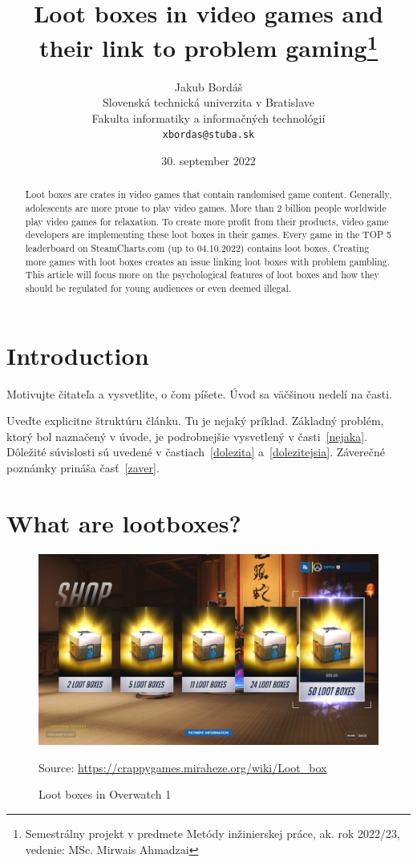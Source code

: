 \documentclass[10pt,twoside,english,a4paper]{coursepaper}
\title{Loot boxes in video games and their link to problem gaming\thanks{Semestrálny projekt v predmete Metódy inžinierskej práce, ak. rok 2022/23, vedenie: MSc. Mirwais Ahmadzai}} %
\author{Jakub Bordáš\\[2pt]
	{\small Slovenská technická univerzita v Bratislave}\\
	{\small Fakulta informatiky a informačných technológií}\\
	{\small \texttt{xbordas@stuba.sk}}
	}
\date{\small 30. september 2022} %
\newcommand{\source}[1]{\caption*{Source: {#1}} }
\begin{document}
\maketitle

\begin{abstract}
Loot boxes are crates in video games that contain randomised game content. Generally, adolescents are more prone to play video games. More than 2 billion people worldwide play video games for relaxation. To create more profit from their products, video game developers are implementing these loot boxes in their games. Every game in the TOP 5 leaderboard on SteamCharts.com (up to 04.10.2022) contains loot boxes. Creating more games with loot boxes creates an issue linking loot boxes with problem gambling. This article will focus more on the psychological features of loot boxes and how they should be regulated for young audiences or even deemed illegal.
\end{abstract}



\section{Introduction}

Motivujte čitateľa a vysvetlite, o čom píšete. Úvod sa väčšinou nedelí na časti.

Uveďte explicitne štruktúru článku. Tu je nejaký príklad.
Základný problém, ktorý bol naznačený v úvode, je podrobnejšie vysvetlený v časti~\ref{nejaka}.
Dôležité súvislosti sú uvedené v častiach~\ref{dolezita} a~\ref{dolezitejsia}.
Záverečné poznámky prináša časť~\ref{zaver}.



\section{What are lootboxes?} \label{what}

\begin{figure}[tbh]
	\centering
	\includegraphics[scale=0.5]{img1}
	\caption{Loot boxes in Overwatch 1}
	\source{\url{https://crappygames.miraheze.org/wiki/Loot_box} }
	\label{fig:img1}
\end{figure}
\end{document}
